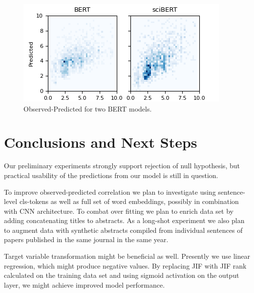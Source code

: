 \documentclass[11pt]{article}
\begin{document}
\begin{figure}
	\includegraphics[width= \columnwidth]{./Images/BERT vs sciBERT.png}
	\caption{Observed-Predicted for two BERT models.}
	\label{fig:BERT_vs_sciBERT}
\end{figure}

\section{Conclusions and Next Steps}
Our preliminary experiments strongly support rejection of null hypothesis, but practical usability of the predictions from our model is still in question.

To improve observed-predicted correlation we plan to investigate using sentence-level cls-tokens as well as full set of word embeddings, possibly in combination with CNN architecture. To combat over fitting we plan to enrich data set by adding concatenating titles to abstracts. As a long-shot experiment we also plan to augment data with synthetic abstracts compiled from individual sentences of papers published in the same journal in the same year.

Target variable transformation might be beneficial as well. Presently we use linear regression, which might produce negative values. By replacing JIF with JIF rank calculated on the training data set and using sigmoid activation on the output layer, we might achieve improved model performance. 



\end{document}
